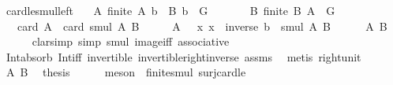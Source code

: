 \begin{isabellebody}
\isamarkupfalse%
%
\endisatagproof
{\isafoldproof}%
%
\isadelimproof
\isanewline
%
\endisadelimproof
\isanewline
{}\isamarkupfalse%
\ card{\isacharunderscore}{\kern0pt}le{\isacharunderscore}{\kern0pt}smul{\isacharunderscore}{\kern0pt}left{\isacharcolon}{\kern0pt}\isanewline
\ \ \ A{\isacharcolon}{\kern0pt}\ {\isachardoublequoteopen}finite\ A{\isachardoublequoteclose}\ {\isachardoublequoteopen}b\ {\isasymin}\ B{\isachardoublequoteclose}\ {\isachardoublequoteopen}b\ {\isasymin}\ G{\isachardoublequoteclose}\isanewline
\ \ \ \ \ \ \ B{\isacharcolon}{\kern0pt}\ {\isachardoublequoteopen}finite\ B{\isachardoublequoteclose}\ {\isachardoublequoteopen}A\ {\isasymsubseteq}\ G{\isachardoublequoteclose}\isanewline
\ \ \ {\isachardoublequoteopen}card\ A\ {\isasymle}\ card\ {\isacharparenleft}{\kern0pt}smul\ A\ B{\isacharparenright}{\kern0pt}{\isachardoublequoteclose}\isanewline
%
\isadelimproof
%
\endisadelimproof
%
\isatagproof
{}\isamarkupfalse%
\ {\isacharminus}{\kern0pt}\isanewline
\ \ \isamarkupfalse%
\ {\isachardoublequoteopen}A\ {\isasymsubseteq}\ {\isacharparenleft}{\kern0pt}{\isasymlambda}\ x{\isachardot}{\kern0pt}\ x\ {\isasymcdot}\ {\isacharparenleft}{\kern0pt}inverse\ b{\isacharparenright}{\kern0pt}{\isacharparenright}{\kern0pt}\ {\isacharbackquote}{\kern0pt}\ smul\ A\ B{\isachardoublequoteclose}\isanewline
\ \ \ \ \isamarkupfalse%
\ A\ B\isanewline
\ \ \ \ \isamarkupfalse%
\ {\isacharparenleft}{\kern0pt}clarsimp\ simp{\isacharcolon}{\kern0pt}\ smul\ image{\isacharunderscore}{\kern0pt}iff\ associative{\isacharparenright}{\kern0pt}\ \ \ \ \ \isanewline
\ \ \ \ \isamarkupfalse%
\ Int{\isacharunderscore}{\kern0pt}absorb{}\ Int{\isacharunderscore}{\kern0pt}iff\ invertible\ invertible{\isacharunderscore}{\kern0pt}right{\isacharunderscore}{\kern0pt}inverse\ assms{\isacharparenleft}{\kern0pt}{}{\isacharparenright}{\kern0pt}\ \isamarkupfalse%
\ {\isacharparenleft}{\kern0pt}metis\ right{\isacharunderscore}{\kern0pt}unit{\isacharparenright}{\kern0pt}\isanewline
\ \ \isamarkupfalse%
\ A\ B\ \isamarkupfalse%
\ {\isacharquery}{\kern0pt}thesis\isanewline
\ \ \ \ \isamarkupfalse%
\ {\isacharparenleft}{\kern0pt}meson\ \ finite{\isacharunderscore}{\kern0pt}smul\ surj{\isacharunderscore}{\kern0pt}card{\isacharunderscore}{\kern0pt}le{\isacharparenright}{\kern0pt}\isanewline
{}\isamarkupfalse%
%
\endisatagproof

\end{isabellebody}
